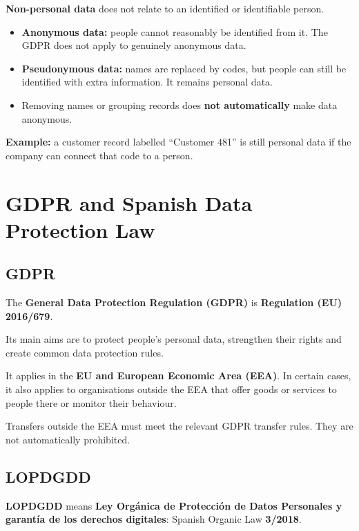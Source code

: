 \documentclass[12pt,a4paper]{report}
\newcommand{\tightlist}{}
\begin{document}
\textbf{Non-personal data} does not relate to an identified or identifiable person.

\begin{itemize}
\tightlist
\item
  \textbf{Anonymous data:} people cannot reasonably be identified from it. The GDPR does not apply to genuinely anonymous data.
\item
  \textbf{Pseudonymous data:} names are replaced by codes, but people can still be identified with extra information. It remains personal data.
\item
  Removing names or grouping records does \textbf{not automatically} make data anonymous.
\end{itemize}

\textbf{Example:} a customer record labelled ``Customer 481'' is still personal data if the company can connect that code to a person.

\hypertarget{gdpr-and-spanish-data-protection-law}{%
\section{GDPR and Spanish Data Protection Law}\label{gdpr-and-spanish-data-protection-law}}

\hypertarget{gdpr}{%
\subsection{GDPR}\label{gdpr}}

The \textbf{General Data Protection Regulation (GDPR)} is \textbf{Regulation (EU) 2016/679}.

Its main aims are to protect people's personal data, strengthen their rights and create common data protection rules.

It applies in the \textbf{EU and European Economic Area (EEA)}. In certain cases, it also applies to organisations outside the EEA that offer goods or services to people there or monitor their behaviour.

Transfers outside the EEA must meet the relevant GDPR transfer rules. They are not automatically prohibited.

\hypertarget{lopdgdd}{%
\subsection{LOPDGDD}\label{lopdgdd}}

\textbf{LOPDGDD} means \textbf{Ley Orgánica de Protección de Datos Personales y garantía de los derechos digitales}: Spanish Organic Law \textbf{3/2018}.
\end{document}
